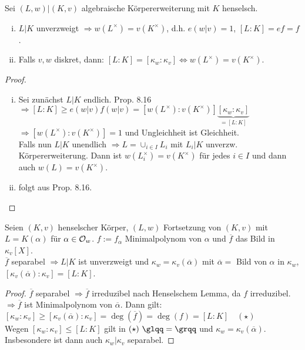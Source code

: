 \begin{Bem}
Sei $(L,w)|(K,v)$ algebraische Körpererweiterung mit $K$ henselsch.
\begin{enumerate}[i)]
\item $L|K$ unverzweigt $\Rightarrow w(L^\times)=v(K^\times)$, d.h. $e(w|v)=1$, $[L:K]=ef=f$.
\item Falls $v,w$ diskret, dann: $[L:K]=[\kappa_w : \kappa_v] \iff w(L^\times)=v(K^\times)$.
\end{enumerate}
\end{Bem}

\begin{proof}
\begin{enumerate}[i)]
\item Sei zunächst $L|K$ endlich. Prop. 8.16\\
$\Rightarrow [L:K] \geq e(w|v)f(w|v)=[w(L^\times):v(K^\times)] \underbrace{[\kappa_w:\kappa_v]}_{=[L:K]}$\\
$\Rightarrow [w(L^\times):v(K^\times)]=1$ und Ungleichheit ist Gleichheit.\\
Falls nun $L|K$ unendlich $\Rightarrow L=\cup_{i \in I} L_i$ mit $L_i|K$ unverzw. Körpererweiterung. Dann ist $w(L_i^\times)=v(K^\times)$ für jedes $i \in I$ und dann auch $w(L)=v(K^\times)$.
\item folgt aus Prop. 8.16.
\end{enumerate}
\end{proof}

\begin{Bsp}
Seien $(K,v)$ henselscher Körper, $(L,w)$ Fortsetzung von $(K,v)$ mit $L=K(\alpha)$ für $\alpha \in \mathcal{O}_w$. $f:=f_\alpha$ Minimalpolynom von $\alpha$ und $\overline{f}$ das Bild in $\kappa_v[X]$.\\
$\overline{f}$ separabel $\Rightarrow L|K$ ist unverzweigt und $\kappa_w=\kappa_v(\overline{\alpha})$ mit $\overline{\alpha}=$ Bild von $\alpha$ in $\kappa_w$, $[\kappa_v(\overline{\alpha}): \kappa_v]=[L:K]$.
\end{Bsp}

\begin{proof}
$\overline{f}$ separabel $\Rightarrow \overline{f}$ irreduzibel nach Henselschem Lemma, da $f$ irreduzibel.\\
$\Rightarrow \overline{f}$ ist Minimalpolynom von $\overline{\alpha}$. Dann gilt:\\
$[\kappa_w:\kappa_v] \geq [\kappa_v(\overline{\alpha}):\kappa_v]=\deg(\overline{f})=\deg(f)=[L : K] \quad (\star)$\\
Wegen $[\kappa_w:\kappa_v] \leq [L : K]$ gilt in $(\star)\ \glqq =\grqq$ und $\kappa_w=\kappa_v(\overline{\alpha})$. Insbesondere ist dann auch $\kappa_w|\kappa_v$ separabel.
\end{proof}

